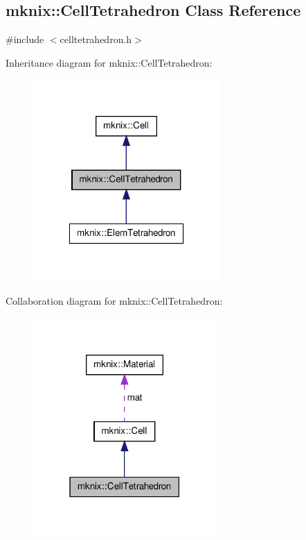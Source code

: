 \hypertarget{classmknix_1_1_cell_tetrahedron}{\subsection{mknix\-:\-:Cell\-Tetrahedron Class Reference}
\label{classmknix_1_1_cell_tetrahedron}
}


{\ttfamily \#include $<$celltetrahedron.\-h$>$}



Inheritance diagram for mknix\-:\-:Cell\-Tetrahedron\-:\nopagebreak
\begin{figure}[H]
\begin{center}
\leavevmode
\includegraphics[width=202pt]{dd/d62/classmknix_1_1_cell_tetrahedron__inherit__graph}
\end{center}
\end{figure}


Collaboration diagram for mknix\-:\-:Cell\-Tetrahedron\-:\nopagebreak
\begin{figure}[H]
\begin{center}
\leavevmode
\includegraphics[width=198pt]{dc/db5/classmknix_1_1_cell_tetrahedron__coll__graph}
\end{center}
\end{figure}
